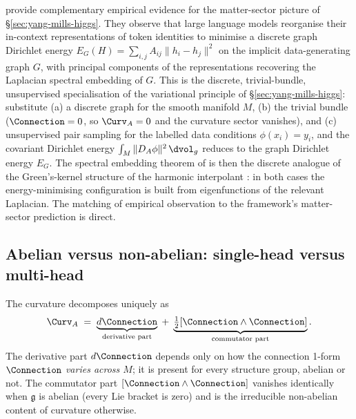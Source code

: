 \begin{remark}\label{rem:park-et-al}
\cite{ParkEtAl2024} provide complementary empirical evidence for the
matter-sector picture of \S\ref{sec:yang-mills-higgs}. They observe
that large language models reorganise their in-context
representations of token identities to minimise a discrete graph
Dirichlet energy
$E_G(H)=\sum_{i,j}A_{ij}\|h_i-h_j\|^2$ on the implicit
data-generating graph $G$, with principal components of the
representations recovering the Laplacian spectral embedding of $G$.
This is the discrete, trivial-bundle, unsupervised specialisation of
the variational principle of \S\ref{sec:yang-mills-higgs}:
substitute (a) a discrete graph for the smooth manifold $M$, (b) the
trivial bundle ($\Connection=0$, so $\Curv_A=0$ and the curvature
sector vanishes), and (c) unsupervised pair sampling for the
labelled data conditions $\phi(x_i)=y_i$, and the covariant Dirichlet
energy $\int_M\|D_A\phi\|^2\,\dvol_g$ reduces to the graph Dirichlet
energy $E_G$. The spectral embedding theorem of
\cite[Theorem~5.1]{ParkEtAl2024} is then the discrete analogue of
the Green's-kernel structure of the harmonic interpolant
\cite[Theorem~13.3]{Vasii2026Paper1}: in both cases the
energy-minimising configuration is built from eigenfunctions of the
relevant Laplacian. The matching of empirical observation to the
framework's matter-sector prediction is direct.
\end{remark}

\subsection{Abelian versus non-abelian: single-head versus multi-head}
\label{ssec:abelian-nonabelian}

The curvature decomposes uniquely as
\[
   \Curv_A \;=\; \underbrace{d\Connection}_{\text{derivative part}}
   \;+\;\underbrace{\tfrac12[\Connection\wedge\Connection]}_{\text{commutator part}}.
\]
The derivative part $d\Connection$ depends only on how the connection
1-form $\Connection$ \emph{varies across $M$}; it is present for every
structure group, abelian or not. The commutator part
$[\Connection\wedge\Connection]$ vanishes identically when
$\mathfrak{g}$ is abelian (every Lie bracket is zero) and is the
irreducible non-abelian content of curvature otherwise.

